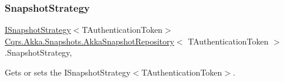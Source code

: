 \subsubsection{\texorpdfstring{Snapshot\+Strategy}{SnapshotStrategy}}
{\footnotesize\ttfamily \hyperlink{interfaceCqrs_1_1Snapshots_1_1ISnapshotStrategy}{I\+Snapshot\+Strategy}$<$T\+Authentication\+Token$>$ \hyperlink{classCqrs_1_1Akka_1_1Snapshots_1_1AkkaSnapshotRepository}{Cqrs.\+Akka.\+Snapshots.\+Akka\+Snapshot\+Repository}$<$ T\+Authentication\+Token $>$.Snapshot\+Strategy\hspace{0.3cm}{\ttfamily [get]}, {\ttfamily [protected]}}



Gets or sets the I\+Snapshot\+Strategy$<$\+T\+Authentication\+Token$>$. 

